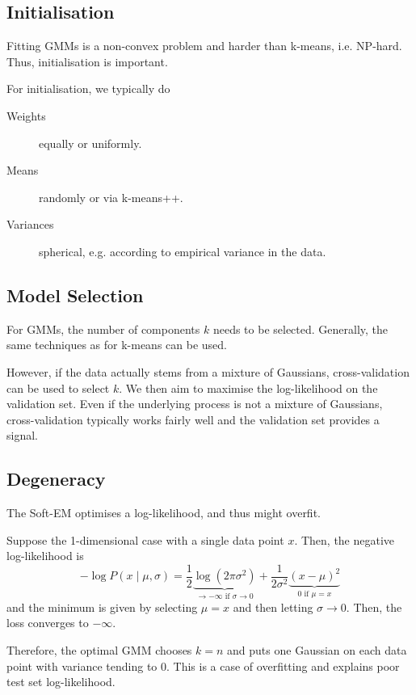 \subsection{Initialisation}
Fitting GMMs is a non-convex problem
and harder than k-means, i.e. NP-hard.
Thus, initialisation is important.

For initialisation, we typically do
\begin{description}
    \item[Weights] equally or uniformly.
    \item[Means] randomly or via k-means++.
    \item[Variances] spherical,
    e.g. according to empirical variance in the data.
\end{description}


\subsection{Model Selection}
For GMMs, the number of components $k$ needs to be selected.
Generally, the same techniques as for k-means can be used.

However, if the data actually stems from a mixture of Gaussians,
cross-validation can be used to select $k$.
We then aim to maximise the log-likelihood on the validation set.
Even if the underlying process is not a mixture of Gaussians,
cross-validation typically works fairly well
and the validation set provides a signal.


\subsection{Degeneracy}
The Soft-EM optimises a log-likelihood,
and thus might overfit.

Suppose the 1-dimensional case with a single data point $x$.
Then, the negative log-likelihood is
\begin{equation*}
    -\log{P(x \mid \mu, \sigma)} =
    \frac{1}{2}
    \underbrace{\log{(2 \pi \sigma^2)}}_\text{$\to -\infty$ if $\sigma \to 0$}
    +
    \frac{1}{2 \sigma^2}
    \underbrace{(x - \mu)^2}_\text{$0$ if $\mu = x$}
\end{equation*}
and the minimum is given by selecting $\mu = x$ and
then letting $\sigma \to 0$.
Then, the loss converges to $-\infty$.

Therefore, the optimal GMM chooses $k=n$ and
puts one Gaussian on each data point with variance
tending to $0$.
This is a case of overfitting and explains poor test set
log-likelihood.


